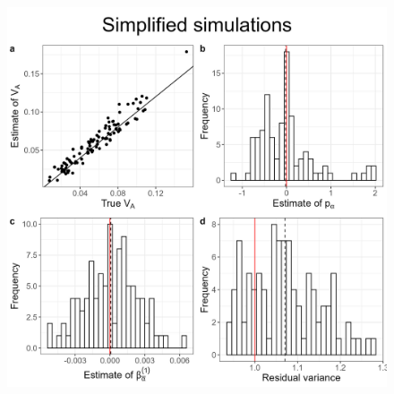 \documentclass[12pt]{article}
\providecommand{\DIFaddbeginFL}{} %
\providecommand{\DIFdelbeginFL}{} %
\providecommand{\DIFdelendFL}{} %
\newcommand{\DIFscaledelfig}{0.5}
\newlength{\DIFdelgraphicswidth} %
\newlength{\DIFdelgraphicsheight} %
\newcommand{\DIFaddincludegraphics}[2][]{{\color{blue}\fbox{\DIFOincludegraphics[#1]{#2}}}} %
\newcommand{\DIFdelincludegraphics}[2][]{%
\sbox{\DIFdelgraphicsbox}{\DIFOincludegraphics[#1]{#2}}%
\settoboxwidth{\DIFdelgraphicswidth}{\DIFdelgraphicsbox} %
\settoboxtotalheight{\DIFdelgraphicsheight}{\DIFdelgraphicsbox} %
\scalebox{\DIFscaledelfig}{%
\parbox[b]{\DIFdelgraphicswidth}{\usebox{\DIFdelgraphicsbox}\\[-\baselineskip] \rule{\DIFdelgraphicswidth}{0em}}\llap{\resizebox{\DIFdelgraphicswidth}{\DIFdelgraphicsheight}{%
\setlength{\unitlength}{\DIFdelgraphicswidth}%
\begin{picture}(1,1)%
\thicklines\linethickness{2pt} %
{\color[rgb]{1,0,0}\put(0,0){\framebox(1,1){}}}%
{\color[rgb]{1,0,0}\put(0,0){\line( 1,1){1}}}%
{\color[rgb]{1,0,0}\put(0,1){\line(1,-1){1}}}%
\end{picture}%
}\hspace*{3pt}}} %
} %
\DeclareRobustCommand{\DIFaddbeginFL}{\DIFOaddbeginFL \let\includegraphics\DIFaddincludegraphics} %
\DeclareRobustCommand{\DIFdelbeginFL}{\DIFOdelbeginFL \let\includegraphics\DIFdelincludegraphics} %
\DeclareRobustCommand{\DIFdelendFL}{\DIFOaddendFL \let\includegraphics\DIFOincludegraphics} %
\begin{document}
\begin{bibunit}
\begin{figure}[H]
\DIFdelbeginFL %
\DIFdelendFL \DIFaddbeginFL \includegraphics[scale = 0.15]{Figures/simplified_main.jpg}

\end{figure}
\end{bibunit}
\end{document}
